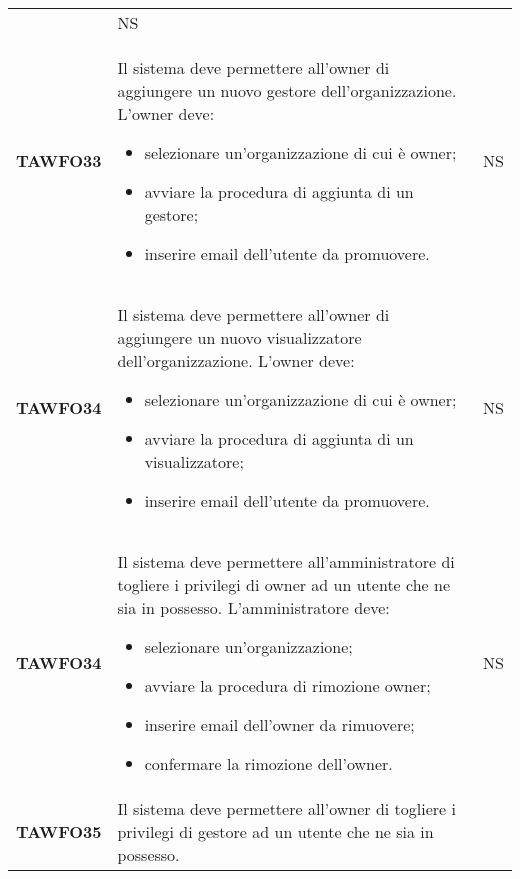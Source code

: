 \documentclass[../piano-di-qualifica.tex]{subfiles}
\begin{document}
\begin{centering}
\begin{longtable}[H]{>{\centering\bfseries}m{3cm} >{}p{10cm} >{\centering\arraybackslash}m{3cm}}
\begin{itemize}
                  \end{itemize}
                  & NS \\
        TAWFO33      & Il sistema deve permettere all'owner di aggiungere un nuovo gestore dell'organizzazione.    \newline
                L'owner deve:
                \begin{itemize}
                \item selezionare un'organizzazione di cui è owner;
                \item avviare la procedura di aggiunta di un gestore;
                \item inserire email dell'utente da promuovere.
                \end{itemize}
                & NS \\
        TAWFO34      & Il sistema deve permettere all'owner di aggiungere un nuovo visualizzatore dell'organizzazione.    \newline
                L'owner deve:
                \begin{itemize}
                \item selezionare un'organizzazione di cui è owner;
                \item avviare la procedura di aggiunta di un visualizzatore;
                \item inserire email dell'utente da promuovere.
                \end{itemize}
                & NS \\
        TAWFO34      & Il sistema deve permettere all'amministratore di togliere i privilegi di owner ad un utente che ne sia in possesso.    \newline
                L'amministratore deve:
                \begin{itemize}
                \item selezionare un'organizzazione;
                \item avviare la procedura di rimozione owner;
                \item inserire email dell'owner da rimuovere;
                \item confermare la rimozione dell'owner.
                \end{itemize}
                & NS \\
        TAWFO35      & Il sistema deve permettere all'owner di togliere i privilegi di gestore ad un utente che ne sia in possesso. \newline

\end{longtable}
\end{centering}
\end{document}
